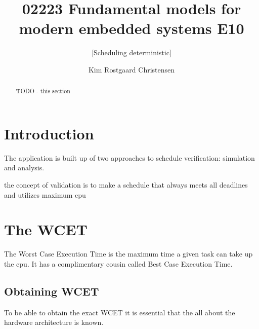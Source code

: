 \documentclass{acm_proc_article-sp}
\begin{document}
\title{02223 Fundamental models for modern embedded systems E10}
\subtitle{[Scheduling deterministic]
}

\author{
\alignauthor 
Kim Rostgaard Christensen\\
}

\maketitle

\begin{abstract}
TODO - this section

\end{abstract}




\section{Introduction}


The application is built up of two approaches to schedule verification: simulation and analysis.

the concept of validation is to make a schedule that always meets all deadlines and utilizes maximum cpu

\section{The WCET}
The Worst Case Execution Time is the maximum time a given task can take up the cpu. It has a complimentary cousin called Best Case Execution Time.


\subsection{Obtaining WCET}
To be able to obtain the exact WCET it is essential that the all about the hardware architecture is known.
\end{document}
